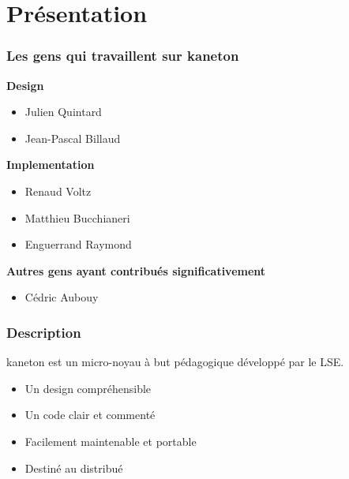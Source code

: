 \section{Pr\'{e}sentation}


\begin{frame}
  \frametitle{Les gens qui travaillent sur kaneton}

  \textbf{Design}

  \begin{itemize}
    \item
      Julien Quintard
    \item
      Jean-Pascal Billaud
  \end{itemize}

  \-

  \textbf{Implementation}

  \begin{itemize}
    \item
      Renaud Voltz
    \item
      Matthieu Bucchianeri
    \item
      Enguerrand Raymond
  \end{itemize}

  \-

  \textbf{Autres gens ayant contribu\'{e}s significativement}

  \begin{itemize}
    \item
      C\'{e}dric Aubouy
  \end{itemize}
\end{frame}


\begin{frame}
  \frametitle{Description}

  kaneton est un micro-noyau \`{a} but p\'{e}dagogique
  d\'{e}velopp\'{e} par le LSE.

  \-

  \begin{itemize}
  \item
    Un design compr\'{e}hensible
  \item
    Un code clair et comment\'{e}
  \item
    Facilement maintenable et portable
  \item
    Destin\'{e} au distribu\'{e}
  \end{itemize}

\end{frame}

